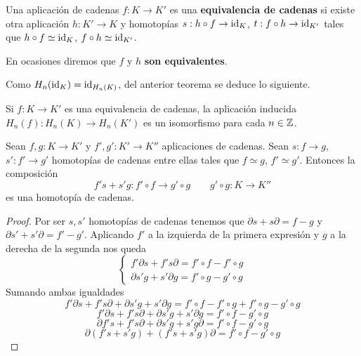 \begin{definicion}
	Una aplicación de cadenas $f: K \rightarrow K'$ es una \textbf{equivalencia de cadenas} si existe otra aplicación $h: K' \rightarrow K$ y homotopías $s: h \circ f \rightarrow \operatorname{id}_K$, $t: f \circ h \rightarrow \operatorname{id}_{K'}$ tales que $h \circ f \simeq \operatorname{id}_K$, $f \circ h \simeq \operatorname{id}_{K'}$.
\end{definicion}
\begin{nota}
	En ocasiones diremos que $f$ y $h$ \textbf{son equivalentes}.
\end{nota}

Como $H_n(\operatorname{id}_K) = \operatorname{id}_{H_n(K)}$, del anterior teorema se deduce lo siguiente.

\begin{corolario}
	\label{cor:equiv-homot}
	Si $f: K \rightarrow K'$ es una equivalencia de cadenas, la aplicación inducida $H_n(f): H_n(K) \rightarrow H_n(K')$ es un isomorfismo para cada $n \in \mathbb{Z}$.
\end{corolario}

\begin{proposicion}
	Sean $f,g: K \rightarrow K'$ y $f',g': K' \rightarrow K''$ aplicaciones de cadenas. Sean $s: f \rightarrow g$, $s': f' \rightarrow g'$ homotopías de cadenas entre ellas tales que $f \simeq g$, $f' \simeq g'$. Entonces la composición
	\[ f' s + s' g: f' \circ f \rightarrow g' \circ g \qquad g' \circ g : K \rightarrow K'' \]
	es una homotopía de cadenas.
\end{proposicion}
\begin{proof}
	Por ser $s,s'$ homotopías de cadenas tenemos que $\partial s + s\partial = f-g$ y $\partial s' + s'\partial = f'-g'$. Aplicando  $f'$ a la izquierda de la primera expresión y $g$ a la derecha de la segunda nos queda
	\begin{equation}
		\begin{cases}
			 f'\partial s + f's\partial = f' \circ f-f' \circ g \\
			 \partial s' g + s'\partial g = f' \circ g-g' \circ g 
		\end{cases}
	\end{equation}
	Sumando ambas igualdades
	\[ f'\partial s + f's\partial + \partial s' g + s'\partial g = f' \circ f-f' \circ g + f' \circ g-g' \circ g \]
	\[ f'\partial s + f's\partial + \partial s' g + s'\partial g = f' \circ f - g' \circ g \]
	\[ \partial f' s + f's \partial + \partial s' g + s' g \partial = f' \circ f - g' \circ g \]
	\[ \partial (f' s + s' g) + (f's + s' g) \partial = f' \circ f - g' \circ g \]
\end{proof}

